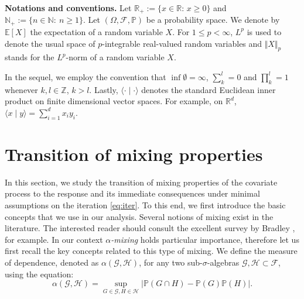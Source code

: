 \documentclass[a4paper,10pt]{article}
\newcommand{\N}{\mathbb{N}}
\newcommand{\Z}{\mathbb{Z}}
\newcommand{\R}{\mathbb{R}}
\newcommand{\F}{\mathcal{F}}
\newcommand{\G}{\mathcal{G}}
\newcommand{\HH}{\mathcal{H}}
\renewcommand{\P}{\mathbb{P}}
\newcommand{\E}{\mathbb{E}}
\begin{document}
\bigskip
\noindent
{\bf Notations and conventions.} Let $\R_{+}:=\{x\in\R:\, x\geq 0\}$
and $\N_{+}:=\{n\in\N:\ n\geq 1\}$. Let $(\Omega,\F,\P)$ be a probability space. We denote by $\E[X]$ the expectation of a random variable $X$. For $1\le p<\infty$, $L^p$ is used to denote the usual space of $p$-integrable real-valued random variables and $\Vert X \Vert_p$ stands for the $L^p$-norm of a random variable $X$.

In the sequel, we employ the convention that $\inf \emptyset=\infty$, $\sum_{k}^{l}=0$ and $\prod_{k}^{l}=1$ whenever $k,l\in\Z$, $k>l$. 
Lastly, $\langle \cdot\mid \cdot\rangle$ denotes the standard Euclidean inner product
on finite dimensional vector spaces. For example, on $\R^d$, $\langle x\mid y\rangle = \sum_{i=1}^{d} x_i y_i$.


\section{Transition of mixing properties}\label{sec:mixtrans}

In this section, we study the transition of mixing properties of the covariate process to the response and its immediate consequences under minimal assumptions on the iteration \eqref{eq:iter}. To this end, we first introduce the basic concepts that we use in our analysis. Several notions of mixing exist in the literature. The interested reader should consult the excellent survey by Bradley \cite{Bradley2005}, for example. In our context \emph{$\alpha$-mixing} holds particular importance, therefore let us first recall the key concepts related to this type of mixing. We define the measure of dependence, denoted as $\alpha(\G, \HH)$, for any two sub-$\sigma$-algebras $\G,\HH \subset \F$, using the equation:
\begin{equation}\label{eq:dep}
\alpha (\G,\HH) = \sup\limits_{G\in\G, H\in\HH} \left|\P (G\cap H)-\P (G)\P (H)\right|.
\end{equation}
\end{document}
